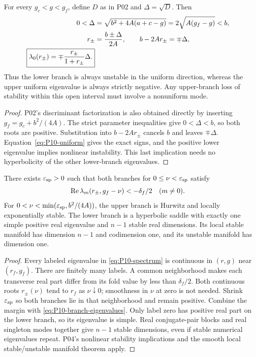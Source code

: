 \begin{proposition}
\label{prop:P10-branch-signs}
For every $g_c<g<g_f$, define $D$ as in P02 and $\Delta=\sqrt D$.
Then
\begin{align}
 0<\Delta&=\sqrt{b^2+4A(a+c-g)}=2\sqrt{A(g_f-g)}<b,\notag\\
 r_\pm&=\frac{b\pm\Delta}{2A},\qquad
 b-2Ar_\pm=\mp\Delta,\label{eq:P10-discriminant}\\
 \boxed{\lambda_0(r_\pm)=\mp\frac{r_\pm}{1+r_\pm}\Delta.}
 \label{eq:P10-branch-eigenvalues}
\end{align}
Thus the lower branch is always unstable in the uniform direction,
whereas the upper uniform eigenvalue is always strictly negative.
Any upper-branch loss of stability within this open interval must
involve a nonuniform mode.
\end{proposition}
\begin{proof}
P02's discriminant factorization is also obtained directly by inserting
$g_f=g_c+b^2/(4A)$. The strict parameter inequalities give $0<\Delta<b$,
so both roots are positive. Substitution into $b-2Ar_\pm$ cancels
$b$ and leaves $\mp\Delta$. Equation~\eqref{eq:P10-uniform}
gives the exact signs, and the positive lower eigenvalue implies
nonlinear instability. This last implication needs no hyperbolicity
of the other lower-branch eigenvalues.
\end{proof}

\begin{corollary}
\label{cor:P10-near-stability}
There exists $\varepsilon_{\rm sp}>0$ such that both branches for
$0\le\nu<\varepsilon_{\rm sp}$ satisfy
\[
 \operatorname{Re}\lambda_m(r_\pm,g_f-\nu)<-\delta_f/2\quad(m\ne0).
\]
For $0<\nu<\min(\varepsilon_{\rm sp},b^2/(4A))$, the upper
branch is Hurwitz and locally exponentially stable. The lower branch
is a hyperbolic saddle with exactly one simple positive real eigenvalue
and $n-1$ stable real dimensions. Its local stable manifold has dimension
$n-1$ and codimension one, and its unstable manifold has dimension one.
\end{corollary}
\begin{proof}
Every labeled eigenvalue in \eqref{eq:P10-spectrum} is continuous
in $(r,g)$ near $(r_f,g_f)$. There are finitely many labels.
A common neighborhood makes each transverse real part differ from
its fold value by less than $\delta_f/2$. Both continuous roots
$r_\pm(\nu)$ tend to $r_f$ as $\nu\downarrow0$; smoothness in
$\nu$ at zero is not needed. Shrink $\varepsilon_{\rm sp}$ so both
branches lie in that neighborhood and remain positive. Combine the
margin with \eqref{eq:P10-branch-eigenvalues}. Only label zero has
positive real part on the lower branch, so its eigenvalue is simple.
Real conjugate-pair blocks and real singleton modes together give
$n-1$ stable dimensions, even if stable numerical eigenvalues repeat.
P04's nonlinear stability implications and the smooth local
stable/unstable manifold theorem apply.
\end{proof}


